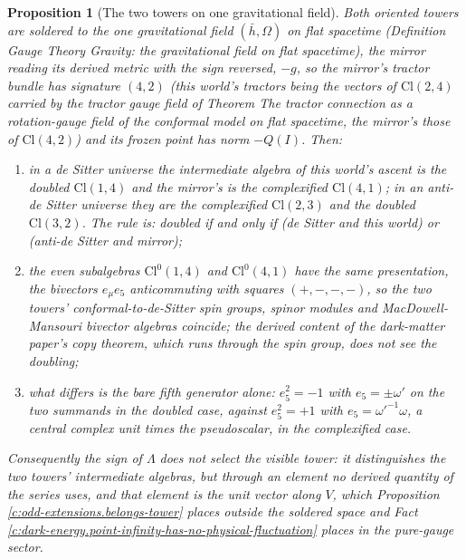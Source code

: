 \documentclass[11pt]{article}
\newtheorem{proposition}[theorem]{Proposition}
\theoremstyle{definition}
\theoremstyle{plain}
\newcommand{\changedmark}[2]{\marginpar{\raggedright\scriptsize\color{#1}#2}}
\providecommand{\Cl}{}\renewcommand{\Cl}{\mathrm{Cl}}
\providecommand{\hb}{}\renewcommand{\hb}{\bar{h}}
\begin{document}
\begin{proposition}[The two towers on one gravitational field]\label{c:odd-extensions.two-towers-one-curved-universe}
\changedmark{gray}{reworded}
Both oriented towers are soldered to the one gravitational field $(\hb, \Omega)$ on flat spacetime (Definition \emph{Gauge Theory Gravity: the gravitational field on flat spacetime}), the mirror reading its derived metric with the sign reversed, $-g$, so the mirror's tractor bundle has signature $(4,2)$ (this world's tractors being the vectors of $\Cl(2,4)$ carried by the tractor gauge field of Theorem \emph{The tractor connection as a rotation-gauge field of the conformal model on flat spacetime}, the mirror's those of $\Cl(4,2)$) and its frozen point has norm $-Q(I)$. Then:
\begin{enumerate}
\item[(i)] in a de Sitter universe the intermediate algebra of this world's ascent is the doubled $\Cl(1,4)$ and the mirror's is the complexified $\Cl(4,1)$; in an anti-de Sitter universe they are the complexified $\Cl(2,3)$ and the doubled $\Cl(3,2)$. The rule is: doubled if and only if (de Sitter and this world) or (anti-de Sitter and mirror);
\item[(ii)] the even subalgebras $\Cl^{0}(1,4)$ and $\Cl^{0}(4,1)$ have the same presentation, the bivectors $e_{\mu}e_{5}$ anticommuting with squares $(+,-,-,-)$, so the two towers' conformal-to-de-Sitter spin groups, spinor modules and MacDowell-Mansouri bivector algebras coincide; the derived content of the dark-matter paper's copy theorem, which runs through the spin group, does not see the doubling;
\item[(iii)] what differs is the bare fifth generator alone: $e_{5}^{2} = -1$ with $e_{5} = \pm\omega'$ on the two summands in the doubled case, against $e_{5}^{2} = +1$ with $e_{5} = \omega'^{-1}\omega$, a central complex unit times the pseudoscalar, in the complexified case.
\end{enumerate}
Consequently the sign of $\Lambda$ does not select the visible tower: it distinguishes the two towers' intermediate algebras, but through an element no derived quantity of the series uses, and that element is the unit vector along $V$, which Proposition \ref{c:odd-extensions.belongs-tower} places outside the soldered space and Fact \ref{c:dark-energy.point-infinity-has-no-physical-fluctuation} places in the pure-gauge sector.
\end{proposition}
\end{document}
